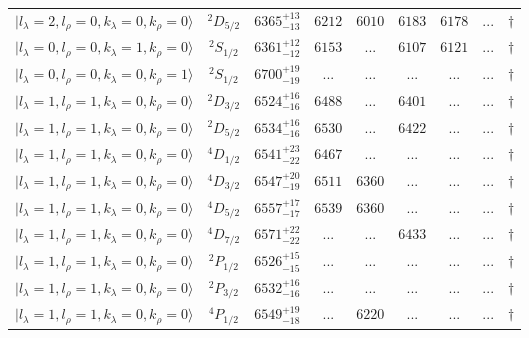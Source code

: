 \begin{tabular}{c c| c c c c c c c}
$\vert l_{\lambda}\!\!=\!2, l_{\rho}\!\!=\!0, k_{\lambda}\!\!=\!0, k_{\rho}\!\!=\!0 \rangle$ & $^{2}D_{5/2}$ & $6365^{+13}_{-13}$ & $6212$ & $6010$ & $6183$ & $6178$ & ... & $\dagger$ \\ 
$\vert l_{\lambda}\!\!=\!0, l_{\rho}\!\!=\!0, k_{\lambda}\!\!=\!1, k_{\rho}\!\!=\!0 \rangle$ & $^{2}S_{1/2}$ & $6361^{+12}_{-12}$ & $6153$ & ... & $6107$ & $6121$ & ... & $\dagger$ \\ 
$\vert l_{\lambda}\!\!=\!0, l_{\rho}\!\!=\!0, k_{\lambda}\!\!=\!0, k_{\rho}\!\!=\!1 \rangle$ & $^{2}S_{1/2}$ & $6700^{+19}_{-19}$ & ... & ... & ... & ... & ... & $\dagger$ \\ 
$\vert l_{\lambda}\!\!=\!1, l_{\rho}\!\!=\!1, k_{\lambda}\!\!=\!0, k_{\rho}\!\!=\!0 \rangle$ & $^{2}D_{3/2}$ & $6524^{+16}_{-16}$ & $6488$ & ... & $6401$ & ... & ... & $\dagger$ \\ 
$\vert l_{\lambda}\!\!=\!1, l_{\rho}\!\!=\!1, k_{\lambda}\!\!=\!0, k_{\rho}\!\!=\!0 \rangle$ & $^{2}D_{5/2}$ & $6534^{+16}_{-16}$ & $6530$ & ... & $6422$ & ... & ... & $\dagger$ \\ 
$\vert l_{\lambda}\!\!=\!1, l_{\rho}\!\!=\!1, k_{\lambda}\!\!=\!0, k_{\rho}\!\!=\!0 \rangle$ & $^{4}D_{1/2}$ & $6541^{+23}_{-22}$ & $6467$ & ... & ... & ... & ... & $\dagger$ \\ 
$\vert l_{\lambda}\!\!=\!1, l_{\rho}\!\!=\!1, k_{\lambda}\!\!=\!0, k_{\rho}\!\!=\!0 \rangle$ & $^{4}D_{3/2}$ & $6547^{+20}_{-19}$ & $6511$ & $6360$ & ... & ... & ... & $\dagger$ \\ 
$\vert l_{\lambda}\!\!=\!1, l_{\rho}\!\!=\!1, k_{\lambda}\!\!=\!0, k_{\rho}\!\!=\!0 \rangle$ & $^{4}D_{5/2}$ & $6557^{+17}_{-17}$ & $6539$ & $6360$ & ... & ... & ... & $\dagger$ \\ 
$\vert l_{\lambda}\!\!=\!1, l_{\rho}\!\!=\!1, k_{\lambda}\!\!=\!0, k_{\rho}\!\!=\!0 \rangle$ & $^{4}D_{7/2}$ & $6571^{+22}_{-22}$ & ... & ... & $6433$ & ... & ... & $\dagger$ \\ 
$\vert l_{\lambda}\!\!=\!1, l_{\rho}\!\!=\!1, k_{\lambda}\!\!=\!0, k_{\rho}\!\!=\!0 \rangle$ & $^{2}P_{1/2}$ & $6526^{+15}_{-15}$ & ... & ... & ... & ... & ... & $\dagger$ \\ 
$\vert l_{\lambda}\!\!=\!1, l_{\rho}\!\!=\!1, k_{\lambda}\!\!=\!0, k_{\rho}\!\!=\!0 \rangle$ & $^{2}P_{3/2}$ & $6532^{+16}_{-16}$ & ... & ... & ... & ... & ... & $\dagger$ \\ 
$\vert l_{\lambda}\!\!=\!1, l_{\rho}\!\!=\!1, k_{\lambda}\!\!=\!0, k_{\rho}\!\!=\!0 \rangle$ & $^{4}P_{1/2}$ & $6549^{+19}_{-18}$ & ... & $6220$ & ... & ... & ... & $\dagger$ \\ 

\end{tabular}
